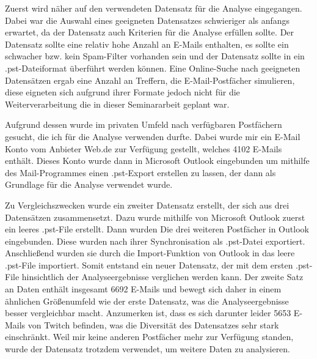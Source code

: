 Zuerst wird näher auf den verwendeten Datensatz für die Analyse eingegangen. Dabei war die Auswahl eines geeigneten Datensatzes schwieriger als anfangs erwartet, da der Datensatz auch Kriterien für die Analyse erfüllen sollte. Der Datensatz sollte eine relativ hohe Anzahl an E-Mails enthalten, es sollte ein schwacher bzw. kein Spam-Filter vorhanden sein und der Datensatz sollte in ein .pst-Dateiformat überführt werden können. Eine Online-Suche nach geeigneten Datensätzen ergab eine Anzahl an Treffern, die E-Mail-Postfächer simulieren, diese eigneten sich aufgrund ihrer Formate jedoch nicht für die Weiterverarbeitung die in dieser Seminararbeit geplant war.

Aufgrund dessen wurde im privaten Umfeld nach verfügbaren Postfächern gesucht, die ich für die Analyse verwenden durfte. Dabei wurde mir ein E-Mail Konto vom Anbieter \glqq{}Web.de\grqq{} zur Verfügung gestellt, welches 4102 E-Mails enthält. Dieses Konto wurde dann in Microsoft Outlook eingebunden um mithilfe des Mail-Programmes einen .pst-Export erstellen zu lassen, der dann als Grundlage für die Analyse verwendet wurde.\newline

Zu Vergleichszwecken wurde ein zweiter Datensatz erstellt, der sich aus drei Datensätzen zusammensetzt. Dazu wurde mithilfe von Microsoft Outlook zuerst ein leeres .pst-File erstellt. Dann wurden Die drei weiteren Postfächer in Outlook eingebunden. Diese wurden nach ihrer Synchronisation als .pst-Datei exportiert. Anschließend wurden sie durch die Import-Funktion von Outlook in das leere .pst-File importiert. Somit entstand ein neuer Datensatz, der mit dem ersten .pst-File hinsichtlich der Analyseergebnisse verglichen werden kann. Der zweite Satz an Daten enthält insgesamt 6692 E-Mails und bewegt sich daher in einem ähnlichen Größenumfeld wie der erste Datensatz, was die Analyseergebnisse besser vergleichbar macht. Anzumerken ist, dass es sich darunter leider 5653 E-Mails von \glqq{}Twitch\grqq{} befinden, was die Diversität des Datensatzes sehr stark einschränkt. Weil mir keine anderen Postfächer mehr zur Verfügung standen, wurde der Datensatz trotzdem verwendet, um weitere Daten zu analysieren. 
